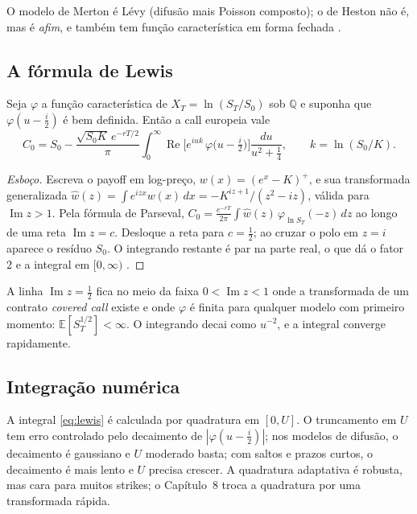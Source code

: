 O modelo de Merton é Lévy (difusão mais Poisson composto); o de Heston não é, mas é \emph{afim}, e também tem função característica em forma fechada \citep{duffiepansingleton2000}.

\subsection{A fórmula de Lewis}

\begin{teorema}[Lewis, 2001]\label{teo:lewis}
Seja $\varphi$ a função característica de $X_T=\ln(S_T/S_0)$ sob $\mathbb Q$ e suponha que $\varphi(u-\tfrac i2)$ é bem definida. Então a call europeia vale
\begin{equation}\label{eq:lewis}
C_0=S_0-\frac{\sqrt{S_0K}\,e^{-rT/2}}{\pi}\int_0^\infty\operatorname{Re}\Big[e^{iuk}\,\varphi\big(u-\tfrac i2\big)\Big]\frac{du}{u^2+\tfrac14},\qquad k=\ln(S_0/K).
\end{equation}
\end{teorema}

\begin{proof}[Esboço]
Escreva o payoff em log-preço, $w(x)=(e^x-K)^+$, e sua transformada generalizada $\hat w(z)=\int e^{izx}w(x)\,dx=-K^{iz+1}/(z^2-iz)$, válida para $\operatorname{Im}z>1$. Pela fórmula de Parseval, $C_0=\frac{e^{-rT}}{2\pi}\int\hat w(z)\,\varphi_{\ln S_T}(-z)\,dz$ ao longo de uma reta $\operatorname{Im}z=c$. Desloque a reta para $c=\tfrac12$; ao cruzar o polo em $z=i$ aparece o resíduo $S_0$. O integrando restante é par na parte real, o que dá o fator $2$ e a integral em $[0,\infty)$ \citep{lewis2001}.
\end{proof}

\begin{observacao}
A linha $\operatorname{Im}z=\tfrac12$ fica no meio da faixa $0<\operatorname{Im}z<1$ onde a transformada de um contrato \emph{covered call} existe e onde $\varphi$ é finita para qualquer modelo com primeiro momento: $\mathbb E[S_T^{1/2}]<\infty$. O integrando decai como $u^{-2}$, e a integral converge rapidamente.
\end{observacao}

\subsection{Integração numérica}

A integral \eqref{eq:lewis} é calculada por quadratura em $[0,U]$. O truncamento em $U$ tem erro controlado pelo decaimento de $|\varphi(u-\tfrac i2)|$; nos modelos de difusão, o decaimento é gaussiano e $U$ moderado basta; com saltos e prazos curtos, o decaimento é mais lento e $U$ precisa crescer. A quadratura adaptativa é robusta, mas cara para muitos strikes; o Capítulo~8 troca a quadratura por uma transformada rápida.

